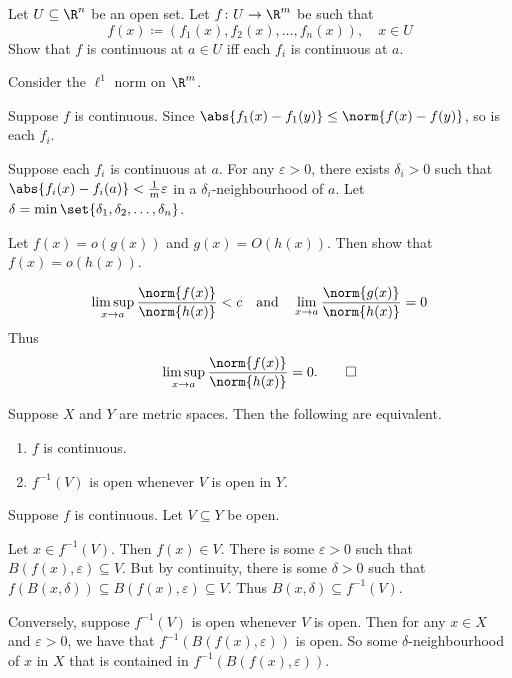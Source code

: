 \begin{exercise} \label{thm:cont:Rn}
    Let $U \subseteq \R^n$ be an open set.
    Let $f\colon U \to \R^m$ be such that \[
        f(x) \coloneq (f_1(x), f_2(x), \dots, f_n(x)), \quad x \in U
    \] Show that $f$ is continuous at $a \in U$ iff each $f_i$ is continuous
    at $a$.
\end{exercise}
\begin{solution}
    Consider the $\ell^1$ norm on $\R^m$.

    Suppose $f$ is continuous.
    Since $\abs{f_1(x) - f_1(y)} \le \norm{f(x) - f(y)}$, so is
    each $f_i$.

    Suppose each $f_i$ is continuous at $a$.
    For any $\varepsilon > 0$, there exists $\delta_i > 0$ such that
    $\abs{f_i(x) - f_i(a)} < \frac1m \varepsilon$ in a
    $\delta_i$-neighbourhood of $a$.
    Let $\delta = \min\set{\delta_1, \delta_2, \dots, \delta_n}$.
\end{solution}

\begin{exercise}
    Let $f(x) = o(g(x))$ and $g(x) = O(h(x))$.
    Then show that $f(x) = o(h(x))$.
\end{exercise}
\begin{solution}
    \[
        \limsup_{x \to a} \frac{\norm{f(x)}}{\norm{h(x)}} < c
        \quad \text{and} \quad
        \lim_{x \to a} \frac{\norm{g(x)}}{\norm{h(x)}} = 0
    \] Thus \[
        \limsup_{x \to a} \frac{\norm{f(x)}}{\norm{h(x)}} = 0. \qedhere
    \]
\end{solution}

\begin{proposition} \label{prp:cont-open}
    Suppose $X$ and $Y$ are metric spaces.
    Then the following are equivalent.
    \begin{enumerate}
        \item $f$ is continuous.
        \item $f^{-1}(V)$ is open whenever $V$ is open in $Y$.
    \end{enumerate}
\end{proposition}
\begin{solution}
    Suppose $f$ is continuous.
    Let $V \subseteq Y$ be open.

    Let $x \in f^{-1}(V)$.
    Then $f(x) \in V$.
    There is some $\varepsilon > 0$ such that
    $B(f(x), \varepsilon) \subseteq V$.
    But by continuity, there is some $\delta > 0$ such that
    $f(B(x, \delta)) \subseteq B(f(x), \varepsilon) \subseteq V$.
    Thus $B(x, \delta) \subseteq f^{-1}(V)$.

    Conversely, suppose $f^{-1}(V)$ is open whenever $V$ is open.
    Then for any $x \in X$ and $\varepsilon > 0$, we have
    that $f^{-1}(B(f(x), \varepsilon))$ is open.
    So some $\delta$-neighbourhood of $x$ in $X$ that is contained
    in $f^{-1}(B(f(x), \varepsilon))$.
\end{solution}
